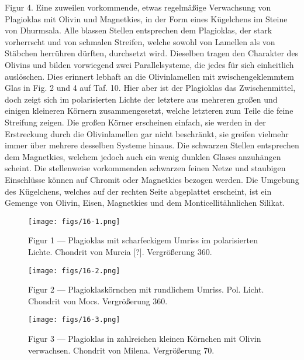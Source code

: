 \documentclass[a4paper, 12pt, oneside]{article}
\begin{document}
Figur 4. Eine zuweilen vorkommende, etwas regelmäßige Verwachsung von Plagioklas mit Olivin und Magnetkies, in der Form eines Kügelchens im Steine von Dhurmsala. Alle blassen Stellen entsprechen dem Plagioklas, der stark vorherrscht und von schmalen Streifen, welche sowohl von Lamellen als von Stäbchen herrühren dürften, durchsetzt wird. Dieselben tragen den Charakter des Olivins und bilden vorwiegend zwei Parallelsysteme, die jedes für sich einheitlich auslöschen. Dies erinnert lebhaft an die Olivinlamellen mit zwischengeklemmtem Glas in Fig. 2 und 4 auf Taf. 10. Hier aber ist der Plagioklas das Zwischenmittel, doch zeigt sich im polarisierten Lichte der letztere aus mehreren großen und einigen kleineren Körnern zusammengesetzt, welche letzteren zum Teile die feine Streifung zeigen. Die großen Körner erscheinen einfach, sie werden in der Erstreckung durch die Olivinlamellen gar nicht beschränkt, sie greifen vielmehr immer über mehrere desselben Systeme hinaus. Die schwarzen Stellen entsprechen dem Magnetkies, welchem jedoch auch ein wenig dunklen Glases anzuhängen scheint. Die stellenweise vorkommenden schwarzen feinen Netze und staubigen Einschlüsse können auf Chromit oder Magnetkies bezogen werden. Die Umgebung des Kügelchens, welches auf der rechten Seite abgeplattet erscheint, ist ein Gemenge von Olivin, Eisen, Magnetkies und dem Monticellitähnlichen Silikat.
\clearpage

\vspace*{\fill}
\begin{figure}[H]
\centering
\texttt{[image: figs/16-1.png]}
\caption{\small Figur 1 --- Plagioklas mit scharfeckigem Umriss im polarisierten Lichte. Chondrit von Murcia [?]. Vergrößerung 360.}
\end{figure}
\vspace*{\fill}
\clearpage

\vspace*{\fill}
\begin{figure}[H]
\centering
\texttt{[image: figs/16-2.png]}
\caption{\small Figur 2 --- Plagioklaskörnchen mit rundlichem Umriss. Pol. Licht. Chondrit von Mocs. Vergrößerung 360.}
\end{figure}
\vspace*{\fill}
\clearpage

\vspace*{\fill}
\begin{figure}[H]
\centering
\texttt{[image: figs/16-3.png]}
\caption{\small Figur 3 --- Plagioklas in zahlreichen kleinen Körnchen mit Olivin verwachsen. Chondrit von Milena. Vergrößerung 70.}
\end{figure}
\vspace*{\fill}
\clearpage
\end{document}
